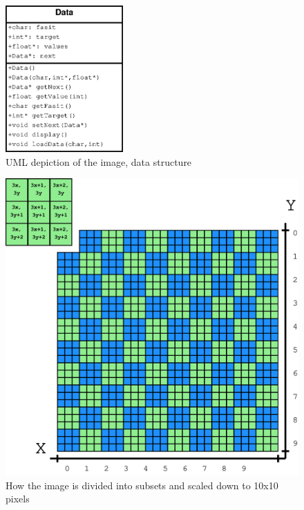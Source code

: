 \begin{figure}[h]
\centering
\includegraphics[width={0.4\textwidth}]{pictures/uml_data}
\caption{UML depiction of the image, data structure}
\label{fig:uml_data}
\end{figure}

\begin{figure}[h]
\centering
\includegraphics[width={1\textwidth}]{pictures/imgSubset}
\caption{How the image is divided into subsets and scaled down to 10x10 pixels}
\label{fig:imgSubset}
\end{figure}



